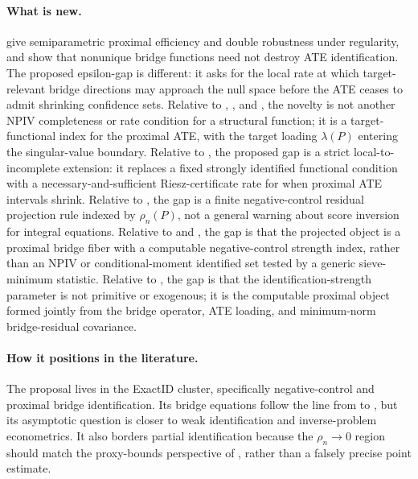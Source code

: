 \documentclass[11pt]{article}
\theoremstyle{definition}
\theoremstyle{plain}
\theoremstyle{remark}
\begin{document}
\paragraph{What is new.}
\cite{CuiPuShiMiaoTchetgen2024} give semiparametric proximal efficiency and
double robustness under regularity, and \cite{ZhangLiMiaoTchetgen2023} show
that nonunique bridge functions need not destroy ATE identification.  The
proposed epsilon-gap is different: it asks for the local rate at which
target-relevant bridge directions may approach the null space before the ATE
ceases to admit shrinking confidence sets.  Relative to
\cite{Freyberger2015}, \cite{CarrascoFlorensRenault2007}, and
\cite{ChenReiss2011}, the novelty is not another NPIV completeness or rate
condition for a structural function; it is a target-functional index for the
proximal ATE, with the target loading $\lambda(P)$ entering the singular-value
boundary.  Relative to
\cite[Abstract and Section 2]{BennettKallusMaoNeweySyrgkanisUehara2023}, the
proposed gap is a strict local-to-incomplete extension: it replaces a fixed
strongly identified functional condition with a necessary-and-sufficient
Riesz-certificate rate for when proximal ATE intervals shrink.  Relative to
\cite[Sections 2--3]{SmuclerRobinsRotnitzky2025}, the gap is a finite
negative-control residual projection rule indexed by $\rho_n(P)$, not a
general warning about score inversion for integral equations.  Relative to
\cite[Sections 2--3]{Santos2012} and \cite[Section 2]{Hong2017}, the gap is
that the projected object is a proximal bridge fiber with a computable
negative-control strength index, rather than an NPIV or conditional-moment
identified set tested by a generic sieve-minimum statistic.  Relative to
\cite[Section 2]{AndrewsCheng2012}, the gap is that the identification-strength
parameter is not primitive or exogenous; it is the computable proximal object
formed jointly from the bridge operator, ATE loading, and minimum-norm
bridge-residual covariance.

\paragraph{How it positions in the literature.}
The proposal lives in the ExactID cluster, specifically negative-control and
proximal bridge identification.  Its bridge equations follow the line from
\cite{MiaoGengTchetgen2018} to \cite{CuiPuShiMiaoTchetgen2024}, but its
asymptotic question is closer to weak identification and inverse-problem
econometrics.  It also borders partial identification because the
$\rho_n\to0$ region should match the proxy-bounds perspective of
\cite{GhassamiShpitserTchetgen2023}, rather than a falsely precise point
estimate.
\end{document}
